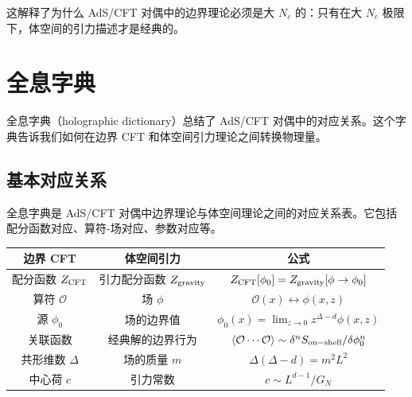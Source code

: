 这解释了为什么 AdS/CFT 对偶中的边界理论必须是大 $N_c$ 的：只有在大 $N_c$ 极限下，体空间的引力描述才是经典的。

\section{全息字典}

全息字典（holographic dictionary）总结了 AdS/CFT 对偶中的对应关系。这个字典告诉我们如何在边界 CFT 和体空间引力理论之间转换物理量。

\subsection{基本对应关系}

\begin{definition}[全息字典]
全息字典是 AdS/CFT 对偶中边界理论与体空间理论之间的对应关系表。它包括配分函数对应、算符-场对应、参数对应等。
\end{definition}

\begin{center}
\begin{tabular}{|c|c|c|}
\hline
\textbf{边界 CFT} & \textbf{体空间引力} & \textbf{公式} \\
\hline
配分函数 $Z_{\rm CFT}$ & 引力配分函数 $Z_{\rm gravity}$ & $Z_{\rm CFT}[\phi_0] = Z_{\rm gravity}[\phi \to \phi_0]$ \\
算符 $\mathcal{O}$ & 场 $\phi$ & $\mathcal{O}(x) \leftrightarrow \phi(x, z)$ \\
源 $\phi_0$ & 场的边界值 & $\phi_0(x) = \lim_{z \to 0} z^{\Delta-d} \phi(x, z)$ \\
关联函数 & 经典解的边界行为 & $\langle \mathcal{O} \cdots \mathcal{O} \rangle \sim \delta^n S_{\rm on-shell}/\delta \phi_0^n$ \\
共形维数 $\Delta$ & 场的质量 $m$ & $\Delta(\Delta-d) = m^2 L^2$ \\
中心荷 $c$ & 引力常数 & $c \sim L^{d-1}/G_N$ \\
\hline
\end{tabular}
\end{center}

